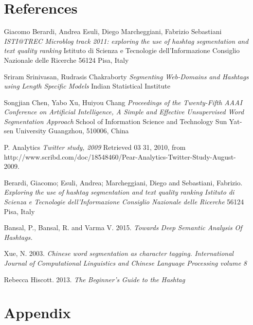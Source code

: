 \documentclass[12pt]{comjnl}
\begin{document}
\section{References}
 \begin{thebibliography}{1}

 Giacomo Berardi, Andrea Esuli, Diego Marcheggiani, Fabrizio Sebastiani {\em ISTI@TREC Microblog track 2011: exploring the use of hashtag segmentation and text quality ranking}
Istituto di Scienza e Tecnologie dell’Informazione Consiglio Nazionale delle Ricerche 56124 Pisa, Italy

 Sriram Srinivasan, Rudrasis Chakraborty {\em Segmenting Web-Domains and Hashtags using Length Specific Models} Indian Statistical Institute

 Songjian Chen, Yabo Xu, Huiyou Chang {\em Proceedings of the Twenty-Fifth AAAI Conference on Artificial Intelligence, A Simple and Effective Unsupervised Word Segmentation Approach} School of Information Science and Technology
Sun Yat-sen University Guangzhou, 510006, China

 P. Analytics {\em Twitter study, 2009} Retrieved 03 31, 2010, from http://www.scribd.com/doc/18548460/Pear-Analytics-Twitter-Study-August-2009.

 Berardi, Giacomo; Esuli, Andrea; Marcheggiani, Diego and Sebastiani, Fabrizio. {\em Exploring the use of hashtag segmentation and text quality ranking  Istituto di Scienza e Tecnologie dell’Informazione Consiglio Nazionale delle Ricerche} 56124 Pisa, Italy


 Bansal, P., Bansal, R. and Varma V. 2015. {\em Towards Deep Semantic Analysis Of Hashtags.}

 Xue, N. 2003. {\em Chinese word segmentation as character tagging. International Journal of Computational
Linguistics and Chinese Language Processing volume 8}

 Rebecca Hiscott. 2013. {\em The Beginner's Guide to the Hashtag}

\nocite{*}
\end{thebibliography}

\section{Appendix}








\end{document}
